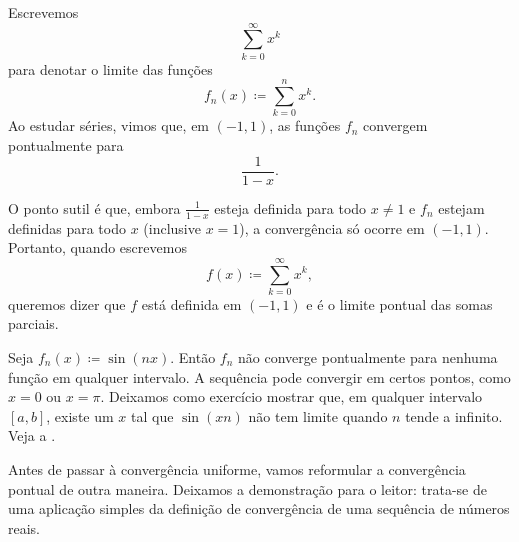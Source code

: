 \begin{example} \label{example:geomsumptconv}
Escrevemos
\begin{equation*}
\sum_{k=0}^\infty x^k
\end{equation*}
para denotar o limite das funções
\begin{equation*}
f_n(x) \coloneqq \sum_{k=0}^n x^k .
\end{equation*}
Ao estudar séries, vimos que, em $(-1,1)$, as funções $f_n$ convergem
pontualmente para
\begin{equation*}
\frac{1}{1-x} .
\end{equation*}

O ponto sutil é que, embora $\frac{1}{1-x}$ esteja definida para todo
$x\neq 1$ e $f_n$ estejam definidas para todo $x$ (inclusive $x=1$), a
convergência só ocorre em $(-1,1)$. Portanto, quando escrevemos
\begin{equation*}
f(x) \coloneqq \sum_{k=0}^\infty x^k ,
\end{equation*}
queremos dizer que $f$ está definida em $(-1,1)$ e é o limite pontual das
somas parciais.
\end{example}

\begin{example}
Seja $f_n(x) \coloneqq \sin(nx)$. Então $f_n$ não converge pontualmente
para nenhuma função em qualquer intervalo. A sequência pode convergir em
certos pontos, como $x=0$ ou $x=\pi$. Deixamos como exercício mostrar que,
em qualquer intervalo $[a,b]$, existe um $x$ tal que $\sin(xn)$ não tem
limite quando $n$ tende a infinito. Veja a .
\begin{myfigureht}
\caption{Gráficos de $\sin(nx)$ para $n=1,2,\ldots,10$, com os valores
maiores de $n$ em cinza mais claro.%
\label{fig:nonconvsinxn}}
\end{myfigureht}
\end{example}

Antes de passar à convergência uniforme, vamos reformular a convergência
pontual de outra maneira. Deixamos a demonstração para o leitor: trata-se de
uma aplicação simples da definição de convergência de uma sequência de
números reais.

